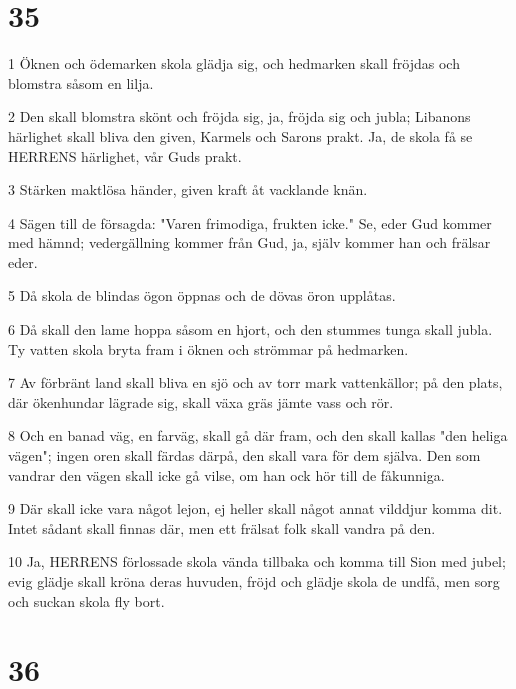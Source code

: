 \chapter{35}

\par 1 Öknen och ödemarken skola glädja sig, och hedmarken skall fröjdas och blomstra såsom en lilja.
\par 2 Den skall blomstra skönt och fröjda sig, ja, fröjda sig och jubla; Libanons härlighet skall bliva den given, Karmels och Sarons prakt. Ja, de skola få se HERRENS härlighet, vår Guds prakt.
\par 3 Stärken maktlösa händer, given kraft åt vacklande knän.
\par 4 Sägen till de försagda: "Varen frimodiga, frukten icke." Se, eder Gud kommer med hämnd; vedergällning kommer från Gud, ja, själv kommer han och frälsar eder.
\par 5 Då skola de blindas ögon öppnas och de dövas öron upplåtas.
\par 6 Då skall den lame hoppa såsom en hjort, och den stummes tunga skall jubla. Ty vatten skola bryta fram i öknen och strömmar på hedmarken.
\par 7 Av förbränt land skall bliva en sjö och av torr mark vattenkällor; på den plats, där ökenhundar lägrade sig, skall växa gräs jämte vass och rör.
\par 8 Och en banad väg, en farväg, skall gå där fram, och den skall kallas "den heliga vägen"; ingen oren skall färdas därpå, den skall vara för dem själva. Den som vandrar den vägen skall icke gå vilse, om han ock hör till de fåkunniga.
\par 9 Där skall icke vara något lejon, ej heller skall något annat vilddjur komma dit. Intet sådant skall finnas där, men ett frälsat folk skall vandra på den.
\par 10 Ja, HERRENS förlossade skola vända tillbaka och komma till Sion med jubel; evig glädje skall kröna deras huvuden, fröjd och glädje skola de undfå, men sorg och suckan skola fly bort.

\chapter{36}

